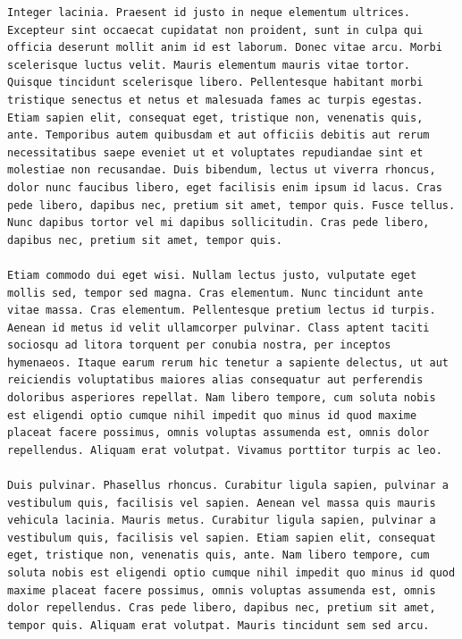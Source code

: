 \documentclass[a4paper, 12pt]{article}
\begin{document}
\begin{verbatim}
Integer lacinia. Praesent id justo in neque elementum ultrices. Excepteur sint occaecat cupidatat non proident, sunt in culpa qui officia deserunt mollit anim id est laborum. Donec vitae arcu. Morbi scelerisque luctus velit. Mauris elementum mauris vitae tortor. Quisque tincidunt scelerisque libero. Pellentesque habitant morbi tristique senectus et netus et malesuada fames ac turpis egestas. Etiam sapien elit, consequat eget, tristique non, venenatis quis, ante. Temporibus autem quibusdam et aut officiis debitis aut rerum necessitatibus saepe eveniet ut et voluptates repudiandae sint et molestiae non recusandae. Duis bibendum, lectus ut viverra rhoncus, dolor nunc faucibus libero, eget facilisis enim ipsum id lacus. Cras pede libero, dapibus nec, pretium sit amet, tempor quis. Fusce tellus. Nunc dapibus tortor vel mi dapibus sollicitudin. Cras pede libero, dapibus nec, pretium sit amet, tempor quis.

Etiam commodo dui eget wisi. Nullam lectus justo, vulputate eget mollis sed, tempor sed magna. Cras elementum. Nunc tincidunt ante vitae massa. Cras elementum. Pellentesque pretium lectus id turpis. Aenean id metus id velit ullamcorper pulvinar. Class aptent taciti sociosqu ad litora torquent per conubia nostra, per inceptos hymenaeos. Itaque earum rerum hic tenetur a sapiente delectus, ut aut reiciendis voluptatibus maiores alias consequatur aut perferendis doloribus asperiores repellat. Nam libero tempore, cum soluta nobis est eligendi optio cumque nihil impedit quo minus id quod maxime placeat facere possimus, omnis voluptas assumenda est, omnis dolor repellendus. Aliquam erat volutpat. Vivamus porttitor turpis ac leo.

Duis pulvinar. Phasellus rhoncus. Curabitur ligula sapien, pulvinar a vestibulum quis, facilisis vel sapien. Aenean vel massa quis mauris vehicula lacinia. Mauris metus. Curabitur ligula sapien, pulvinar a vestibulum quis, facilisis vel sapien. Etiam sapien elit, consequat eget, tristique non, venenatis quis, ante. Nam libero tempore, cum soluta nobis est eligendi optio cumque nihil impedit quo minus id quod maxime placeat facere possimus, omnis voluptas assumenda est, omnis dolor repellendus. Cras pede libero, dapibus nec, pretium sit amet, tempor quis. Aliquam erat volutpat. Mauris tincidunt sem sed arcu.


\end{verbatim}
\end{document}
